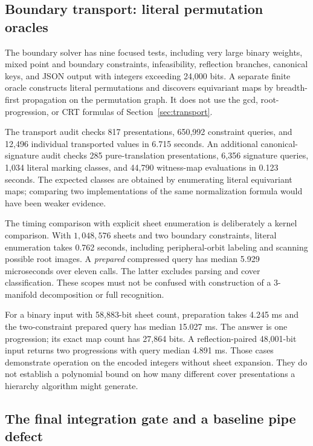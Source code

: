 \subsection{Boundary transport: literal permutation oracles}

The boundary solver has nine focused tests, including very large binary
weights, mixed point and boundary constraints, infeasibility, reflection
branches, canonical keys, and JSON output with integers exceeding
24,000 bits. A separate
finite oracle constructs literal permutations and discovers equivariant
maps by breadth-first propagation on the permutation graph. It does not
use the gcd, root-progression, or CRT formulas of
Section~\ref{sec:transport}.

The transport audit checks 817 presentations, 650,992 constraint queries,
and 12,496 individual transported values in 6.715 seconds. An additional
canonical-signature audit checks 285 pure-translation presentations,
6,356 signature queries, 1,034 literal marking classes, and 44,790
witness-map evaluations in 0.123 seconds. The expected classes are obtained
by enumerating literal equivariant maps; comparing two implementations of
the same normalization formula would have been weaker evidence.

The timing comparison with explicit sheet enumeration is deliberately a
kernel comparison. With $1,048,576$ sheets and two boundary constraints,
literal enumeration takes 0.762 seconds, including peripheral-orbit
labeling and scanning possible root images. A \emph{prepared} compressed
query has median 5.929 microseconds over eleven calls. The latter excludes
parsing and cover classification. These scopes must not be confused with construction of a
3-manifold decomposition or full recognition.

For a binary input with 58,883-bit sheet count, preparation takes 4.245 ms
and the two-constraint prepared query has median 15.027 ms. The answer is
one progression; its exact map count has 27,864 bits. A reflection-paired
48,001-bit input returns two progressions with query median 4.891 ms.
Those cases demonstrate operation on the encoded integers without sheet
expansion. They do not establish a polynomial bound on how many different
cover presentations a hierarchy algorithm might generate.

\subsection{The final integration gate and a baseline pipe defect}

